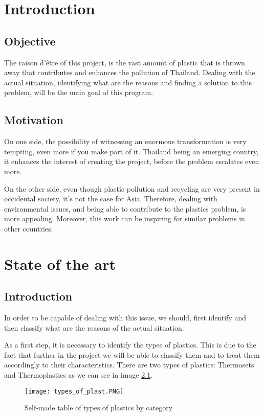 \documentclass[twoside,a4paper,12pt]{report}
\begin{document}
\tableofcontents
\listoffigures  %
\setcounter{section}{0}
\chapter{Introduction}
    \section{Objective} 
    The raison d'être of this project, is the vast amount of plastic that is thrown away that  contributes and enhances the pollution of Thailand. Dealing with the actual situation, identifying what are the reasons and finding a solution to this problem, will be the main goal of this program.

    \section{Motivation}
    On one side, the possibility of witnessing an enormous transformation is very tempting, even more if you make part of it. Thailand being an emerging country, it enhances the interest of creating the project, before the problem escalates even more.

    On the other side, even though plastic pollution and recycling are very present in occidental society, it's not the case for Asia. Therefore, dealing with environmental issues, and being able to contribute to the plastics problem, is more appealing. Moreover, this work  can be inspiring for similar problems in other countries.
\clearpage

\chapter{State of the art}
\section{Introduction}
In order to be capable of dealing with this issue, we should, first identify and then classify what are the reasons of the actual situation.

As a first step, it is necessary to identify the types of plastics. This is due to the fact that further in the project we will be able to classify them and to treat them accordingly to their characteristics. There are two types of plastics: Thermosets and Thermoplastics as we can see in image \ref{fig:Typesofplastic}.


\begin{figure}
    \centering
    \texttt{[image: types\_of\_plast.PNG]}
    \caption{Self-made table of types of plastics by category}\cite{Plas19}
     \label{fig:Typesofplastic}
\end{figure}
\end{document}
